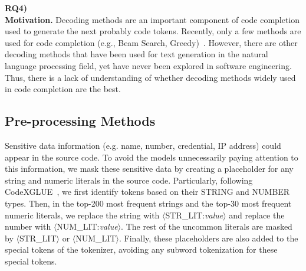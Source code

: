 \begin{description}
    \item \textbf{RQ4) \rqfour} \\
    \textbf{Motivation.}
    Decoding methods are an important component of code completion used to generate the next probably code tokens.
    Recently, only a few methods are used for code completion (e.g., Beam Search, Greedy)~\cite{svyatkovskiy2020intellicode, kim2021code, izadi2022codefill, li2017code}.
    However, there are other decoding methods that have been used for text generation in the natural language processing field, yet have never been explored in software engineering.
    Thus, there is a lack of understanding of whether decoding methods widely used in code completion are the best.
\end{description}





\subsection{Pre-processing Methods}
Sensitive data information (e.g. name, number, credential, IP address) could appear in the source code.
To avoid the models unnecessarily paying attention to this information, we mask these sensitive data by creating a placeholder for any string and numeric literals in the source code.
Particularly, following CodeXGLUE~\cite{lu2021codexglue}, we first identify tokens based on their STRING and NUMBER types.
Then, in the top-200 most frequent strings and the top-30 most frequent numeric literals, we replace the string with $\langle$STR\_LIT:\textit{value}$\rangle$ 
 and replace the number with $\langle$NUM\_LIT:\textit{value}$\rangle$.
The rest of the uncommon literals are masked by $\langle$STR\_LIT$\rangle$ or $\langle$NUM\_LIT$\rangle$.
Finally, these placeholders are also added to the special tokens of the tokenizer, avoiding any subword tokenization for these special tokens.

